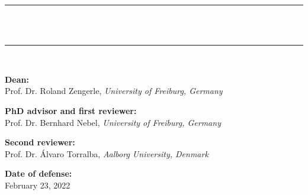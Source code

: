 \begin{titlingpage}

  \small {}

  \vspace{0.5cm}

  \rule{\textwidth}{0.4mm}\\%

  \huge {}\\

  \vspace{-0.4cm}

  \rule{\textwidth}{0.4mm}\\%

  \vspace{2.5cm}


  \vspace{1cm}

  \vspace{1.5cm}

  \LARGE {}

  \normalsize

  \clearpage

  \vspace*{\fill}
  \begin{flushleft}
    \noindent
    \textbf{Dean:}\\
    Prof. Dr. Roland Zengerle, \emph{University of Freiburg, Germany}\\

    \bigskip

    \noindent
    \textbf{PhD advisor and first reviewer:}\\
    Prof. Dr. Bernhard Nebel, \emph{University of Freiburg, Germany}\\

    \bigskip

    \noindent
    \textbf{Second reviewer:}\\
    Prof. Dr. {\'A}lvaro Torralba, \emph{Aalborg University, Denmark}%

    \bigskip

    \noindent
    \textbf{Date of defense:}\\
    February 23, 2022
    

  \end{flushleft}
\end{titlingpage}
